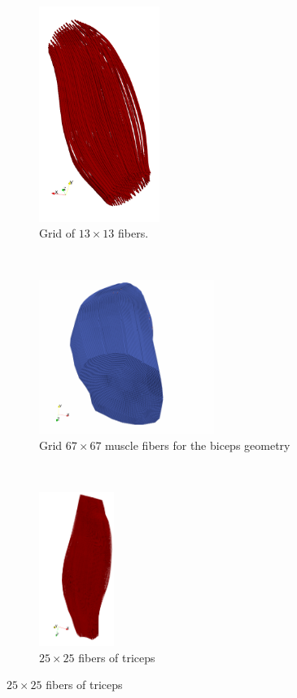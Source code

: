 \begin{figure}
\begin{subfigure}[t]{0.30\textwidth}
    \centering%
    \includegraphics[height=7cm]{images/parallel_fiber_estimation/muscle_mesh_2b.png}
    \caption{Grid of $13 \times 13$ fibers.}%
    \label{fig:muscle_mesh_2}%
  \end{subfigure}
  \\
  \begin{subfigure}[t]{0.25\textwidth}%
    \centering%
    \includegraphics[height=5cm]{images/parallel_fiber_estimation/muscle_mesh_3.png}
    \caption{Grid $67 \times 67$ muscle fibers for the biceps geometry}%
    \label{fig:muscle_mesh_3}%
  \end{subfigure} 
  \,
  \begin{subfigure}[t]{0.15\textwidth}%
    \centering%
    \includegraphics[height=5cm]{images/parallel_fiber_estimation/triceps_25x25.png}
    \caption{$25 \times 25$ fibers of triceps}%
    \label{fig:muscle_mesh_5}%
  \end{subfigure} 

\end{figure}
